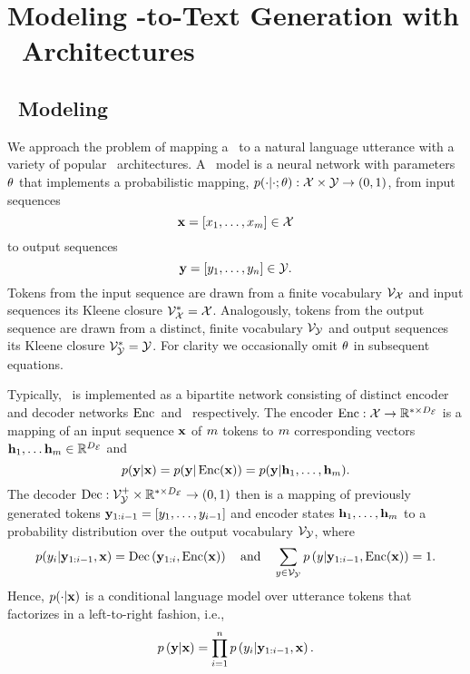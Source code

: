 \section{Modeling \MeaningRepresentation-to-Text Generation with \SequencetoSequence~Architectures}
\label{mrtproblemdef}

\subsection{\SequencetoSequence~Modeling}

We approach the problem of mapping a \meaningrepresentation~to a natural
language utterance with a variety of popular \sequencetosequence~architectures.
A \sequencetosequence~model is a neural network with parameters $\theta$ that
implements a probabilistic mapping, $p(\cdot|\cdot;\theta) : \mathcal{X}
\times \mathcal{Y} \rightarrow (0,1)$, from input sequences 
\[
    \mathbf{x} = \left[x_1,\ldots,x_{m}\right] \in \mathcal{X}
\]
to output sequences 
\[
    \mathbf{y} = \left[y_1, \ldots, y_n\right] \in \mathcal{Y}.
\]
Tokens from the input sequence are drawn from a finite vocabulary $\mathcal{V}_{\mathcal{X}}$
and input sequences its Kleene closure $\mathcal{V}_{\mathcal{X}}^* = \mathcal{X}$.  Analogously,
tokens from the output sequence are drawn from a distinct, finite vocabulary
$\mathcal{V}_{\mathcal{Y}}$ and output sequences its Kleene closure $\mathcal{V}_{\mathcal{Y}}^* = \mathcal{Y}$.
For clarity we occasionally omit $\theta$ in subsequent equations.

Typically, \gen~is implemented as a bipartite network consisting of distinct
encoder and decoder networks $\operatorname{Enc}$~and \decMod~respectively.  The encoder
$\operatorname{Enc} : \mathcal{X} \rightarrow \mathbb{R}^{*\times{D_\mathcal{E}}}$ is a mapping of an
input sequence $\mathbf{x}$ of $m$ tokens to $m$ corresponding vectors
$\mathbf{h}_1,\ldots\mathbf{h}_{m} \in \mathbb{R}^{{D_\mathcal{E}}}$ and
\[ 
    p(\mathbf{y}|\mathbf{x}) = p(\mathbf{y}|\operatorname{Enc}(\mathbf{x})) = p(\mathbf{y}|\mathbf{h}_1,\ldots,\mathbf{h}_{m}).
\]
The decoder $\operatorname{Dec} : \mathcal{V}_{\mathcal{Y}}^+ \times \mathbb{R}^{*\times {D_\mathcal{E}}} \rightarrow
(0,1)$ then is a mapping of previously generated tokens $\mathbf{y}_{1:i-1} =
\left[y_1,\ldots,y_{i-1}\right]$ and encoder states
$\mathbf{h}_1,\ldots,\mathbf{h}_{m}$ to a probability distribution over the
output vocabulary $\mathcal{V}_{\mathcal{Y}}$, where
\[ 
    p(y_i|\mathbf{y}_{1:i-1},\mathbf{x}) = \operatorname{Dec}\left(\mathbf{y}_{1:i}, \operatorname{Enc}(\mathbf{x})\right)   \quad \textrm{and} \quad \sum_{y\in \mathcal{V}_{\mathcal{Y}}} p\left(y| \mathbf{y}_{1:i-1}, \operatorname{Enc}(\mathbf{x})\right) = 1.  
\]
Hence, $p(\cdot|\mathbf{x})$ is a conditional language model over utterance
tokens that factorizes in a left-to-right fashion, i.e.,
\[
    p\left( \mathbf{y}| \mathbf{x} \right) = \prod_{i=1}^n p\left(y_i|\mathbf{y}_{1:i-1},\mathbf{x}\right). 
\]

